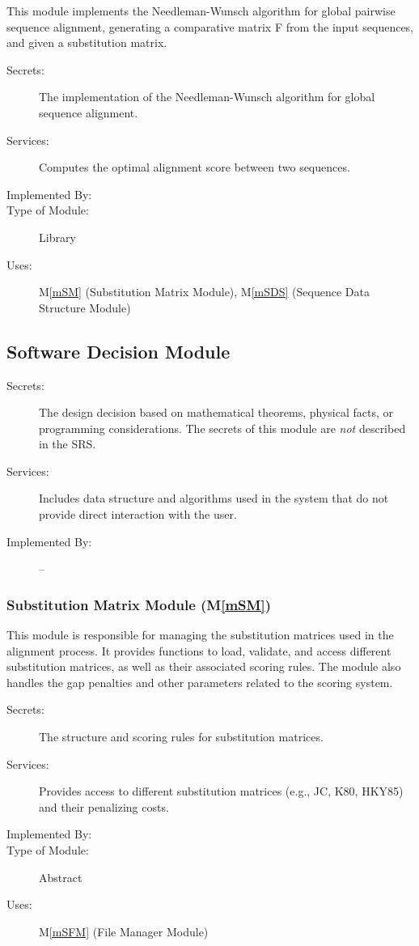 \documentclass[12pt, titlepage]{article}
\newcommand{\mref}[1]{M\ref{#1}}
\begin{document}
This module implements the Needleman-Wunsch algorithm for global pairwise sequence alignment, generating a comparative matrix F from the input sequences, and given a substitution matrix.
\begin{description}
\item[Secrets:] The implementation of the Needleman-Wunsch algorithm for global sequence alignment.
\item[Services:] Computes the optimal alignment score between two sequences.
\item[Implemented By:] \progname{}
\item[Type of Module:] Library
\item[Uses:] \mref{mSM} (Substitution Matrix Module), \mref{mSDS} (Sequence Data Structure Module)
\end{description}


\subsection{Software Decision Module}

\begin{description}
\item[Secrets:] The design decision based on mathematical theorems, physical
  facts, or programming considerations. The secrets of this module are
  \emph{not} described in the SRS.
\item[Services:] Includes data structure and algorithms used in the system that
  do not provide direct interaction with the user. 
\item[Implemented By:] --
\end{description}

\subsubsection{Substitution Matrix Module (\mref{mSM})}
This module is responsible for managing the substitution matrices used in the alignment
process. It provides functions to load, validate, and access different substitution
matrices, as well as their associated scoring rules. The module also handles the 
gap penalties and other parameters related to the scoring system.
\begin{description}
  \item[Secrets:] The structure and scoring rules for substitution matrices.
  \item[Services:] Provides access to different substitution matrices (e.g., JC, K80, HKY85) and their penalizing costs.
  \item[Implemented By:] \progname{}
  \item[Type of Module:] Abstract 
  \item[Uses:] \mref{mSFM} (File Manager Module)
\end{description}
\end{document}
